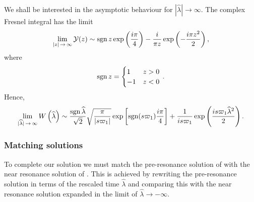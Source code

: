 We shall be interested in the asymptotic behaviour for $|\widehat{\lambda}| \rightarrow \infty$. The complex Fresnel integral has the limit \citep[7.5.3, 7.5.4, 7.12.2, 7.12.3]{Olver2010}
\begin{equation}
\lim_{|z|\,\rightarrow\,\infty} \mathcal{Y}(z) \sim \operatorname{sgn} z \exp\left(\dfrac{i\pi}{4}\right) - \dfrac{i}{\pi z}\exp\left(-\dfrac{i\pi z^2}{2}\right),
\end{equation}
where 
\begin{equation}
\operatorname{sgn} z = \begin{cases}
1 & z > 0 \\
-1 & z < 0
\end{cases}\,.
\end{equation}
Hence,
\begin{equation}
\lim_{|\widehat{\lambda}|\,\rightarrow\,\infty}W\left(\widehat{\lambda}\right) \sim \dfrac{\operatorname{sgn} \widehat{\lambda}}{\sqrt{2}}\sqrt{\dfrac{\pi}{|s\varpi_1|}}\exp\left[\operatorname{sgn}(s\varpi_1)\dfrac{i\pi}{4}\right] + \dfrac{1}{is\varpi_1}\exp\left(\dfrac{is \varpi_1 \widehat{\lambda}^2}{2}\right).
\label{eq:Fres-limit}
\end{equation}

\subsubsection{Matching solutions}

To complete our solution we must match the pre-resonance solution of  with the near resonance solution of . This is achieved by rewriting the pre-resonance solution in terms of the rescaled time $\widehat{\lambda}$ and comparing this with the near resonance solution expanded in the limit of $\widehat{\lambda} \rightarrow -\infty$.

